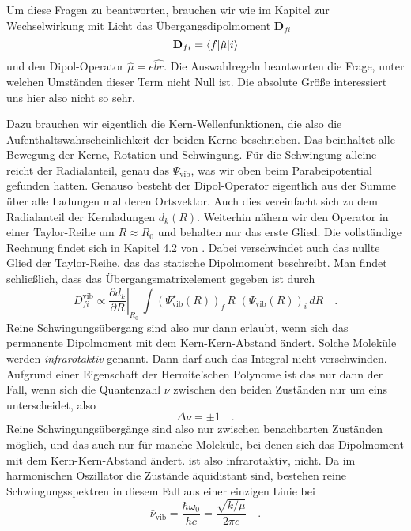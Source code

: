 Um diese Fragen zu beantworten, brauchen wir wie im Kapitel zur Wechselwirkung mit Licht das  Übergangsdipolmoment $\mathbf{D}_{fi}$ 
\begin{equation}
 \mathbf{D}_{fi} = \braket{f | \hat{\mu} | i} 
\end{equation}
und den Dipol-Operator $\hat{\mu}= e \hat{br}$. Die Auswahlregeln beantworten die Frage, unter welchen Umständen dieser Term nicht Null ist. Die absolute Größe interessiert uns hier also nicht so sehr.


Dazu brauchen wir eigentlich  die Kern-Wellenfunktionen, die also die Aufenthaltswahrscheinlichkeit der beiden Kerne beschrieben. Das beinhaltet alle Bewegung der Kerne, Rotation und Schwingung. Für die Schwingung alleine reicht der Radialanteil, genau das $\Psi_\text{vib}$, was wir oben beim Parabeipotential gefunden hatten.
 Genauso besteht der Dipol-Operator eigentlich aus der Summe über alle Ladungen mal deren Ortsvektor. Auch dies vereinfacht sich zu dem Radialanteil der Kernladungen $d_k(R)$. Weiterhin nähern wir den Operator in einer Taylor-Reihe um $R \approx R_0$ und behalten nur das erste Glied. Die vollständige Rechnung findet sich in Kapitel 4.2 von \cite{Demtröder_molekuelphysik}. Dabei verschwindet auch das nullte Glied der Taylor-Reihe, das das statische Dipolmoment beschreibt. Man findet schließlich, dass das Übergangsmatrixelement gegeben ist durch
\begin{equation}
D_{fi}^\text{vib} \propto  \left. \frac{\partial d_k}{\partial R} \right|_{R_0} \,  \int (\Psi_\text{vib}^\star (R) )_f \, R  \, \, (\Psi_\text{vib} (R) )_i \, dR \quad .
\end{equation}
Reine Schwingungsübergang sind also nur dann erlaubt, wenn sich das permanente Dipolmoment mit dem Kern-Kern-Abstand ändert. Solche Moleküle werden \emph{infrarotaktiv} genannt. Dann  darf auch das Integral nicht verschwinden. Aufgrund einer Eigenschaft der Hermite'schen Polynome ist das nur dann der Fall, wenn sich die Quantenzahl $\nu$ zwischen den beiden Zuständen nur um eins unterscheidet, also 
\begin{equation}
 \Delta \nu = \pm 1 \quad .
\end{equation}
Reine Schwingungsübergänge sind also nur zwischen benachbarten Zuständen möglich, und das auch nur für manche Moleküle, bei denen sich das Dipolmoment mit dem Kern-Kern-Abstand ändert.  ist also infrarotaktiv,  nicht. Da im harmonischen Oszillator die Zustände äquidistant sind, bestehen reine Schwingungsspektren in diesem Fall aus einer einzigen Linie bei 
\begin{equation}
 \bar{\nu}_\text{vib} = \frac{\hbar \omega_0}{h c} = \frac{\sqrt{k / \mu} }{2 \pi  c} \quad .
\end{equation}

